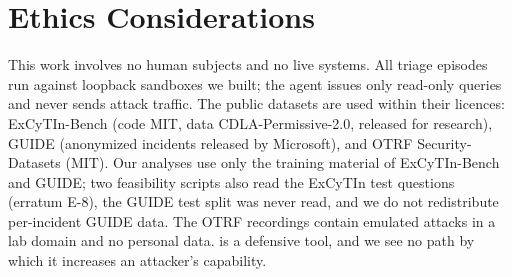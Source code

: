 \section*{Ethics Considerations}
This work involves no human subjects and no live systems. All triage episodes run against loopback sandboxes we built; the agent issues only read-only queries and never sends attack traffic. The public datasets are used within their licences: ExCyTIn-Bench (code MIT, data CDLA-Permissive-2.0, released for research), GUIDE (anonymized incidents released by Microsoft), and OTRF Security-Datasets (MIT). Our analyses use only the training material of ExCyTIn-Bench and GUIDE; two feasibility scripts also read the ExCyTIn test questions (erratum E-8), the GUIDE test split was never read, and we do not redistribute per-incident GUIDE data. The OTRF recordings contain emulated attacks in a lab domain and no personal data. \hesp{} is a defensive tool, and we see no path by which it increases an attacker's capability.
